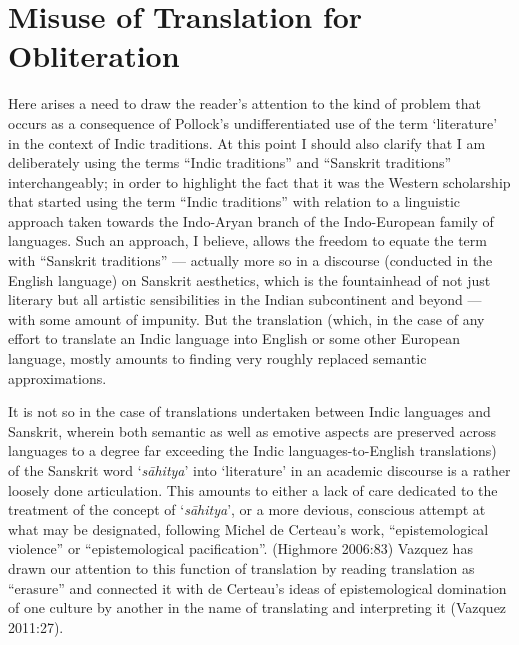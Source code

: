 \section*{Misuse of Translation for Obliteration}

Here arises a need to draw the reader’s attention to the kind of problem that occurs as a consequence of Pollock’s undifferentiated use of the term ‘literature’ in the context of Indic traditions. At this point I should also clarify that I am deliberately using the terms “Indic traditions” and “Sanskrit traditions” interchangeably; in order to highlight the fact that it was the Western scholarship that started using the term “Indic traditions” with relation to a linguistic approach taken towards the Indo-Aryan branch of the Indo-European family of languages. Such an approach, I believe, allows the freedom to equate the term with “Sanskrit traditions” --- actually more so in a discourse (conducted in the English language) on Sanskrit aesthetics, which is the fountainhead of not just literary but all artistic sensibilities in the Indian subcontinent and beyond --- with some amount of impunity. But the translation (which, in the case of any effort to translate an Indic language into English or some other European language, mostly amounts to finding very roughly replaced semantic approximations. 

It is not so in the case of translations undertaken between Indic languages and Sanskrit, wherein both semantic as well as emotive aspects are preserved across languages to a degree far exceeding the Indic languages-to-English translations) of the Sanskrit word ‘\textsl{sāhitya}’ into ‘literature’ in an academic discourse is a rather loosely done articulation. This amounts to either a lack of care dedicated to the treatment of the concept of ‘\textsl{sāhitya}’, or a more devious, conscious attempt at what may be designated, following Michel de Certeau’s work, “epistemological violence” or “epistemological pacification”. (Highmore 2006:83) Vazquez has drawn our attention to this function of translation by reading translation as “erasure” and connected it with de Certeau’s ideas of epistemological domination of one culture by another in the name of translating and interpreting it (Vazquez 2011:27). 

